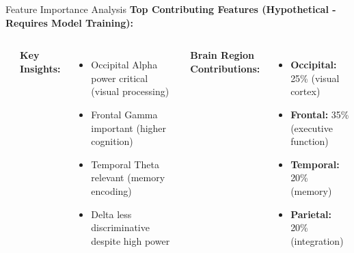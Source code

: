 \documentclass[aspectratio=169]{beamer}
\begin{document}
\begin{frame}{Feature Importance Analysis}
\textbf{Top Contributing Features (Hypothetical - Requires Model Training):}

\begin{columns}[c]
\begin{center}
\end{center}

\textbf{Key Insights:}
\begin{itemize}
    \item Occipital Alpha power critical (visual processing)
    \item Frontal Gamma important (higher cognition)
    \item Temporal Theta relevant (memory encoding)
    \item Delta less discriminative despite high power
\end{itemize}

\vspace{3mm}

\textbf{Brain Region Contributions:}
\begin{itemize}
    \item \textbf{Occipital:} 25\% (visual cortex)
    \item \textbf{Frontal:} 35\% (executive function)
    \item \textbf{Temporal:} 20\% (memory)
    \item \textbf{Parietal:} 20\% (integration)
\end{itemize}
\end{columns}
\end{frame}
\end{document}
